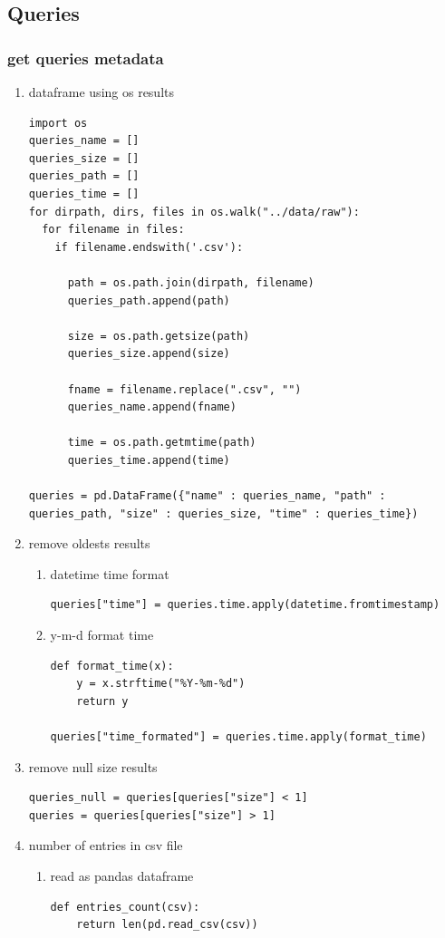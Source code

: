\documentclass[11pt]{article}
\begin{document}
\subsection{Queries}
\label{sec:org1a9c51e}
\subsubsection{get queries metadata}
\label{sec:orgc992f72}
\begin{enumerate}
\item dataframe using os results
\label{sec:org9255c3e}
\begin{verbatim}
import os
queries_name = []
queries_size = []
queries_path = []
queries_time = []
for dirpath, dirs, files in os.walk("../data/raw"): 
  for filename in files:
    if filename.endswith('.csv'):
      
      path = os.path.join(dirpath, filename)
      queries_path.append(path)
      
      size = os.path.getsize(path)
      queries_size.append(size)
      
      fname = filename.replace(".csv", "")
      queries_name.append(fname)
      
      time = os.path.getmtime(path)
      queries_time.append(time)

queries = pd.DataFrame({"name" : queries_name, "path" : queries_path, "size" : queries_size, "time" : queries_time})      
\end{verbatim}
\item remove oldests results
\label{sec:org5f7877e}
\begin{enumerate}
\item datetime time format
\label{sec:orgbb67a57}
\begin{verbatim}
queries["time"] = queries.time.apply(datetime.fromtimestamp)
\end{verbatim}

\item y-m-d format time
\label{sec:org03028d3}
\begin{verbatim}
def format_time(x):
    y = x.strftime("%Y-%m-%d")
    return y

queries["time_formated"] = queries.time.apply(format_time)
\end{verbatim}
\end{enumerate}
\item remove null size results
\label{sec:orgbe22b27}
\begin{verbatim}
queries_null = queries[queries["size"] < 1]
queries = queries[queries["size"] > 1]
\end{verbatim}
\item number of entries in csv file
\label{sec:orgc27b587}
\begin{enumerate}
\item read as pandas dataframe
\label{sec:orgae6c522}
\begin{verbatim}
def entries_count(csv):
    return len(pd.read_csv(csv))


\end{verbatim}
\end{enumerate}
\end{enumerate}
\end{document}
